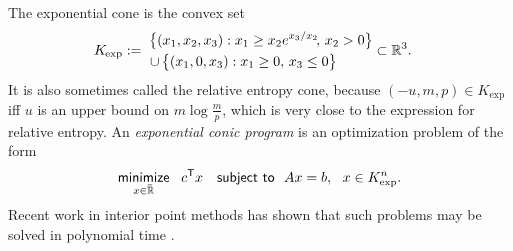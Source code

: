 \documentclass[twoside]{article}
\begin{document}
%
%
The exponential cone is the convex set
\begin{align*}
    K_{\mskip-1mu\exp} &:=\!\!\!\!\!
        \begin{aligned}
        \big\{ (x_1, x_2, x_3) &: 
                x_1 \ge x_2 e^{x_3 / x_2}\!,\, x_2 > 0 \big\} 
            \\[-0.2ex]\quad \mathbin{\cup}\, 
        \big\{ (x_1, 0, x_3&) : x_1 \ge 0,\, x_3 \le 0 \big\} 
    \end{aligned}
    \subset \mathbb R^3.
\end{align*}
It is also sometimes called the relative entropy cone, because
$(-u, m, p) \in K_{\exp}$ iff $u$ is an upper bound on $m \log \frac m p$, 
which is very close to the expression for relative entropy.
%
An \emph{exponential conic program} is an optimization problem of the
form 
\[ 
    \mathop{\text{\sf minimize}}\limits_{x \in \mskip1mu\overline{\mskip-1mu\mathbb R\!}\,}~~ c^{\sf T} x
    \quad\text{\sf subject to}~~ Ax = b,~~x \in K_{\exp}^n.
\]
Recent work in interior point methods has shown that such problems may be solved in polynomial time \parencite{dahl2022primal}. 
\end{document}
